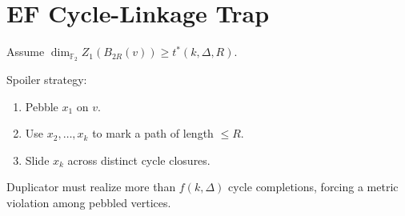\section*{EF Cycle-Linkage Trap}

Assume $\dim_{\mathbb F_2} Z_1(B_{2R}(v)) \ge t^*(k,\Delta,R)$.

Spoiler strategy:
\begin{enumerate}
\item Pebble $x_1$ on $v$.
\item Use $x_2,\dots,x_k$ to mark a path of length $\le R$.
\item Slide $x_k$ across distinct cycle closures.
\end{enumerate}

Duplicator must realize more than $f(k,\Delta)$ cycle completions,
forcing a metric violation among pebbled vertices.

